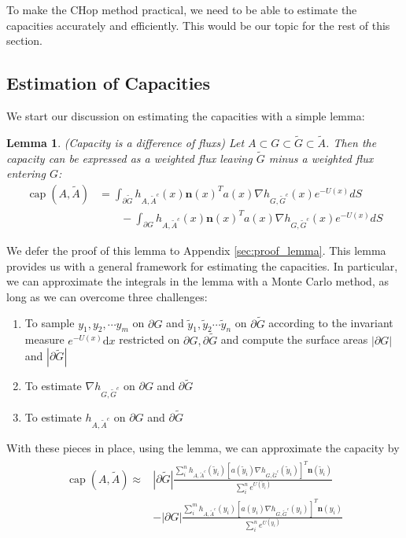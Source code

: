 \documentclass[english, aip, jcp, priprint, graphicx,floatfix]{revtex4-1}
\newtheorem{lemma}{Lemma}
\theoremstyle{plain}
\theoremstyle{definition}
\theoremstyle{plain}
\begin{document}
To make the CHop method practical, we need to be able to estimate the capacities accurately and efficiently. This would be our topic for the rest of this section.

\subsection{Estimation of Capacities}

We start our discussion on estimating the capacities with a simple lemma:

\begin{lemma}(Capacity is a difference of fluxs) \label{lem:capacity_lemma} Let $A\subset G \subset \tilde G \subset \tilde A$.  Then the capacity can be expressed as a weighted flux leaving $\tilde G$ minus a weighted flux entering $G$:
\begin{align*}
\ensuremath{\operatorname{cap}} (A, \tilde{A}) &= \int_{\partial \tilde G}  h_{A, \tilde{A}^c} (x)   \textbf{n}(x)^T a (x) \nabla h_{G, \tilde{G}^c} (x)e^{- U (x)} dS \\
&\qquad - \int_{\partial G}  h_{A, \tilde{A}^c} (x)   \textbf{n}(x)^T a (x) \nabla h_{G, \tilde{G}^c} (x)e^{- U (x)} dS 
\end{align*}
\end{lemma}

We defer the proof of this lemma to Appendix \ref{sec:proof_lemma}. This lemma provides us with a general framework for estimating the capacities.   In particular, we can approximate the integrals in the lemma with a Monte Carlo method, as long as we can overcome three challenges:
\begin{enumerate}
    \item To sample $y_1,y_2,\cdots y_m$ on $\partial G$ and $\tilde y_1,\tilde y_2 \cdots \tilde y_n$ on $\partial \tilde{G}$ according to the invariant measure $e^{- U(x)}\mathrm{d}x$ restricted on $\partial G, \partial \tilde{G}$ and compute the surface areas $|\partial G|$ and $|\partial \tilde G|$

\item To estimate $\nabla h_{G, \tilde{G}^c}$ on $\partial G$ and
$\partial \tilde{G}$

\item To estimate $h_{A, \tilde{A}^c}$ on $\partial G$ and $\partial
\tilde{G}$
\end{enumerate}
With these pieces in place, using the lemma, we can approximate the capacity by
\begin{gather}\label{eq:capesteq}
\begin{array}{cc}
\ensuremath{\operatorname{cap}} (A, \tilde{A}) \approx & 
|\partial \tilde G|\frac{\sum_i^n h_{A,\tilde A^c}(\tilde y_i)[a(\tilde y_i)\nabla h_{G,\tilde G^c}(\tilde y_i)]^T \textbf{n}(\tilde y_i)}{\sum_i^n e^{U(\tilde y_i)}} \\
& - |\partial G|\frac{\sum_i^m h_{A,\tilde A^c}(y_i)[a(y_i)\nabla h_{G,\tilde G^c}(y_i)]^T \textbf{n}(y_i)}{\sum_i^n e^{U(y_i)}} 
\end{array}
\end{gather}
\end{document}
